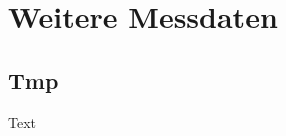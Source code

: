 \chapter{Weitere Messdaten}
\label{chap:appendix_a}

   \section{Tmp}
   \label{sec:app_a_tmp}
   
      Text

      
